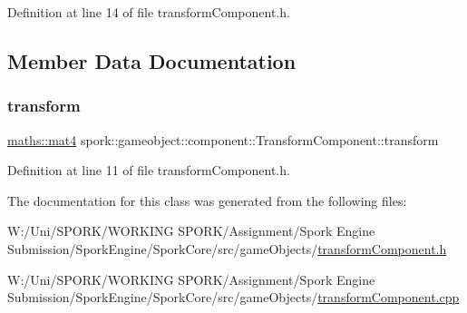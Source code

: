 Definition at line 14 of file transform\+Component.\+h.



\subsection{Member Data Documentation}
\mbox{\label{classspork_1_1gameobject_1_1component_1_1_transform_component_a326265123b0804f6e947cb0dd16f5492}} 
\subsubsection{\texorpdfstring{transform}{transform}}
{\footnotesize\ttfamily \hyperlink{structspork_1_1maths_1_1mat4}{maths\+::mat4} spork\+::gameobject\+::component\+::\+Transform\+Component\+::transform}



Definition at line 11 of file transform\+Component.\+h.



The documentation for this class was generated from the following files\+:\begin{DoxyCompactItemize}
\item 
W\+:/\+Uni/\+S\+P\+O\+R\+K/\+W\+O\+R\+K\+I\+N\+G S\+P\+O\+R\+K/\+Assignment/\+Spork Engine Submission/\+Spork\+Engine/\+Spork\+Core/src/game\+Objects/\hyperlink{transform_component_8h}{transform\+Component.\+h}\item 
W\+:/\+Uni/\+S\+P\+O\+R\+K/\+W\+O\+R\+K\+I\+N\+G S\+P\+O\+R\+K/\+Assignment/\+Spork Engine Submission/\+Spork\+Engine/\+Spork\+Core/src/game\+Objects/\hyperlink{transform_component_8cpp}{transform\+Component.\+cpp}\end{DoxyCompactItemize}
